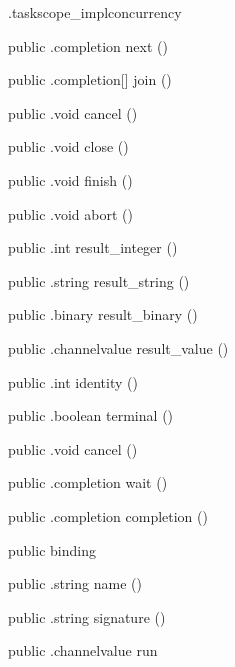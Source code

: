 \begin{CrexxClass}{.taskscope\_impl}{concurrency}
\begin{Members}
    \Method
      {public}
      {.completion}
      {next}
      {()}

    \Method
      {public}
      {.completion[]}
      {join}
      {()}

    \Method
      {public}
      {.void}
      {cancel}
      {()}

    \Method
      {public}
      {.void}
      {close}
      {()}

    \Method
      {public}
      {.void}
      {finish}
      {()}

    \Method
      {public}
      {.void}
      {abort}
      {()}

    \Method
      {public}
      {.int}
      {result\_integer}
      {()}

    \Method
      {public}
      {.string}
      {result\_string}
      {()}

    \Method
      {public}
      {.binary}
      {result\_binary}
      {()}

    \Method
      {public}
      {.channelvalue}
      {result\_value}
      {()}

    \Method
      {public}
      {.int}
      {identity}
      {()}

    \Method
      {public}
      {.boolean}
      {terminal}
      {()}

    \Method
      {public}
      {.void}
      {cancel}
      {()}

    \Method
      {public}
      {.completion}
      {wait}
      {()}

    \Method
      {public}
      {.completion}
      {completion}
      {()}

    \Factory
      {public}
      {binding}
      {}

    \Method
      {public}
      {.string}
      {name}
      {()}

    \Method
      {public}
      {.string}
      {signature}
      {()}

    \Method
      {public}
      {.channelvalue}
      {run}
      {}


\end{Members}
\end{CrexxClass}
